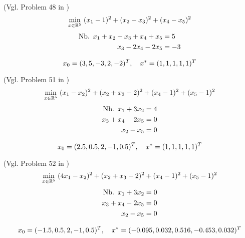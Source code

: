 \begin{testproblem}
(Vgl. Problem 48 in \cite[S.~71]{hock})
\begin{equation}
\min_{x\in\mathbb{R}^5}\ (x_1 - 1)^2 + (x_2 - x_3)^2 + (x_4 - x_5)^2
\end{equation}
\begin{equation*}
\begin{split}
\nb x_1 + x_2 + x_3 + x_4 + x_5 & = 5 \\
x_3 - 2 x_4 - 2 x_5 & = -3 \\
\end{split}
\end{equation*}

\begin{equation*}
x_0 = (3, 5, -3, 2, -2)^T,\quad x^* = (1, 1, 1, 1, 1)^T
\end{equation*}
\end{testproblem}

\begin{testproblem}
(Vgl. Problem 51 in \cite[S.~74]{hock})
\begin{equation}
\min_{x\in\mathbb{R}^5}\ (x_1 - x_2)^2 + (x_2 + x_3 - 2)^2 + (x_4 - 1)^2 + (x_5 - 1)^2
\end{equation}
\begin{equation*}
\begin{split}
\nb x_1 + 3 x_2 & = 4 \\
x_3 + x_4 - 2 x_5 & = 0 \\
x_2 - x_5 & = 0 \\
\end{split}
\end{equation*}

\begin{equation*}
x_0 = (2.5, 0.5, 2, -1, 0.5)^T,\quad x^* = (1, 1, 1, 1, 1)^T
\end{equation*}
\end{testproblem}

\begin{testproblem}
(Vgl. Problem 52 in \cite[S.~75]{hock})
\begin{equation}
\min_{x\in\mathbb{R}^5}\ (4 x_1 - x_2)^2 + (x_2 + x_3 - 2)^2 + (x_4 - 1)^2 + (x_5 - 1)^2
\end{equation}
\begin{equation*}
\begin{split}
\nb x_1 + 3 x_2 & = 0 \\
x_3 + x_4 - 2 x_5 & = 0 \\
x_2 - x_5 & = 0 \\
\end{split}
\end{equation*}

\begin{equation*}
x_0 = (-1.5, 0.5, 2, -1, 0.5)^T,\quad x^* = (-0.095, 0.032, 0.516, -0.453, 0.032)^T
\end{equation*}
\end{testproblem}

